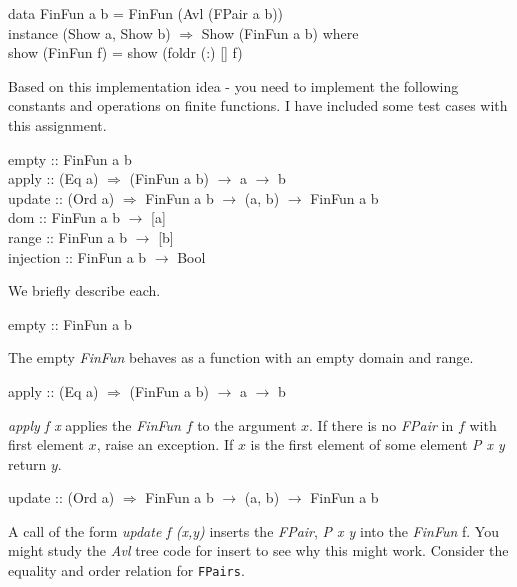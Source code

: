 \documentclass[11pt]{article}
\begin{document}
\begin{smallprogram*}
\>   data FinFun a b = FinFun (Avl (FPair a b)) \vspace{1em} \\
\>   instance (Show a, Show b) $\Rightarrow$ Show (FinFun a b) where\\
\>      show (FinFun f) = show (foldr (:) [] f) \\
\end{smallprogram*}

\begin{exercise}
  Based on this implementation idea - you need to implement the following
  constants and operations on finite functions.  I have included some test
  cases with this assignment.

\begin{smallprogram*}
\>  empty :: FinFun a b \\
\>  apply :: (Eq a) $\Rightarrow$ (FinFun a b) $\rightarrow$ a $\rightarrow$ b \\
\>  update :: (Ord a) $\Rightarrow$ FinFun a b $\rightarrow$ (a, b) $\rightarrow$ FinFun a b \\
\>  dom :: FinFun a b $\rightarrow$ [a] \\
\>  range :: FinFun a b $\rightarrow$ [b] \\
\>  injection :: FinFun a b $\rightarrow$ Bool
\end{smallprogram*}

We briefly describe each.

\begin{smallprogram*}
\>  empty :: FinFun a b \\
\end{smallprogram*}
The empty {\it{FinFun}} behaves as a function with an empty domain and range.


\begin{smallprogram*}
\>  apply :: (Eq a) $\Rightarrow$ (FinFun a b) $\rightarrow$ a $\rightarrow$ b \\
\end{smallprogram*} {\it{apply f x}} applies the {\it{FinFun}} $f$ to the
argument $x$.  If there is no {\it{FPair}} in $f$ with first element $x$, raise
an exception. If $x$ is the first element of some element {\it{P x y}} return
$y$.

\begin{smallprogram*}
\>  update :: (Ord a) $\Rightarrow$ FinFun a b $\rightarrow$ (a, b) $\rightarrow$ FinFun a b \\
\end{smallprogram*} 
A call of the form {\it{update f (x,y)}} inserts the {\it{FPair}}, {\it{P x y}}
into the {\it{FinFun}} f. You might study the {\it{Avl}} tree code for insert
to see why this might work. Consider the equality and order relation for
{\tt{FPairs}}.


\end{exercise}
\end{document}

